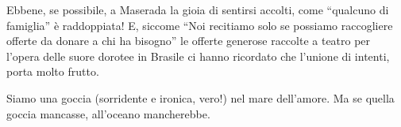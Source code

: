 Ebbene, se possibile, a Maserada la gioia di sentirsi accolti, come “qualcuno di famiglia” è raddoppiata! E, siccome “Noi recitiamo solo se possiamo raccogliere offerte da donare a chi ha bisogno” le offerte generose raccolte a teatro per l’opera delle suore dorotee in Brasile ci hanno ricordato che l’unione di intenti, porta molto frutto.

Siamo una goccia (sorridente e ironica, vero!) nel mare dell’amore. Ma se quella goccia mancasse, all’oceano mancherebbe.



